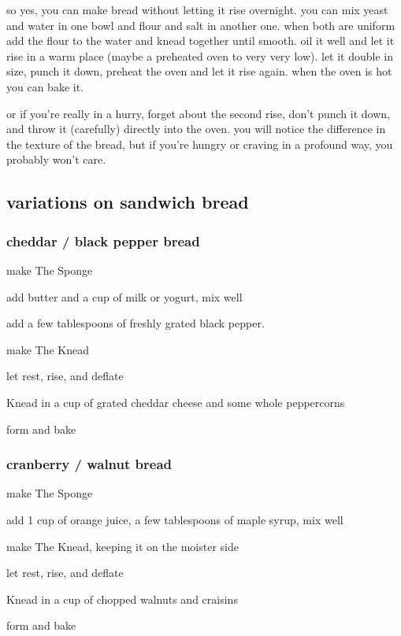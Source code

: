 so yes, you can make bread without letting it rise overnight. you can
mix yeast and water in one bowl and flour and salt in another
one. when both are uniform add the flour to the water and knead
together until smooth. oil it well and let it rise in a warm place
(maybe a preheated oven to very very low). let it double in size,
punch it down, preheat the oven and let it rise again. when the oven
is hot you can bake it.

or if you're really in a hurry, forget about the second rise,
don't punch it down, and throw it (carefully) directly into the
oven. you will notice the difference in the texture of the bread, but
if you're hungry or craving in a profound way, you probably
won't care.

\subsection{variations on sandwich bread}

\subsubsection{cheddar / black pepper bread}

\begin{algorithm}
  \item make The Sponge
  \item add butter and a cup of milk or yogurt, mix well
  \item add a few tablespoons of freshly grated black pepper.
  \item make The Knead
  \item let rest, rise, and deflate
  \item Knead in a cup of grated cheddar cheese and some whole peppercorns
  \item form and bake
\end{algorithm}

\subsubsection{cranberry / walnut bread}

\begin{algorithm}
  \item make The Sponge
  \item add 1 cup of orange juice, a few tablespoons of maple syrup, mix well
  \item make The Knead, keeping it on the moister side
  \item let rest, rise, and deflate
  \item Knead in a cup of chopped walnuts and craisins
  \item form and bake
\end{algorithm}

